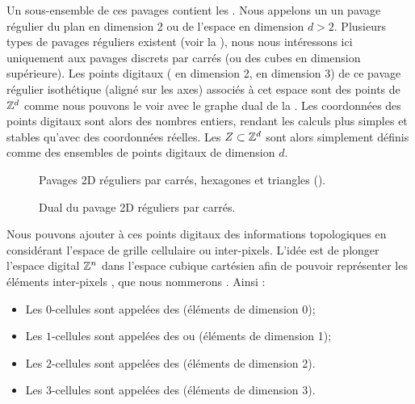 Un sous-ensemble de ces pavages contient les . Nous
appelons un  un pavage régulier du plan en dimension 2
ou de l'espace en dimension $d > 2$. Plusieurs types de pavages réguliers
existent (voir la ), nous nous intéressons ici uniquement
aux pavages discrets par carrés (ou des cubes en dimension supérieure). Les
points digitaux ( en dimension 2,  en
dimension 3) de ce pavage régulier isothétique (aligné sur les axes) associés à
cet espace sont des points de $\mathbb{Z}^d$ comme nous pouvons le voir avec le graphe
dual de la . Les coordonnées des points digitaux sont
alors des nombres entiers, rendant les calculs plus simples et stables qu'avec
des coordonnées réelles. Les  $Z \subset \mathbb{Z}^d$
sont alors simplement définis comme des ensembles de points digitaux de
dimension $d$.

\begin{figure}[ht]
  \begin{center}
    
    \caption{Pavages 2D réguliers par carrés, hexagones et triangles ().\label{fig:pavages}}
  \end{center}
\end{figure}

\begin{figure}[ht]
  \begin{center}
    
    \caption{Dual du pavage 2D réguliers par carrés.\label{fig:pavage_dual}}
  \end{center}
\end{figure}

Nous pouvons ajouter à ces points digitaux des informations topologiques en
considérant l'espace de grille cellulaire ou inter-pixels. L'idée est de plonger
l'espace digital $\mathbb{Z}^n$ dans l'espace cubique cartésien afin de pouvoir
représenter les éléments inter-pixels \cite{Kovalesvsky1989, Khalimsky1990,
Francon1991}, que nous nommerons . Ainsi :
%
\begin{itemize}
%
  \item Les $0$-cellules sont appelées des  (éléments
  de dimension 0);
%
  \item Les $1$-cellules sont appelées des  ou
   (éléments de dimension 1);
%
  \item Les $2$-cellules sont appelées des  (éléments de
  dimension 2).
%
  \item Les $3$-cellules sont appelées des  (éléments de
  dimension 3).
%
\end{itemize}

